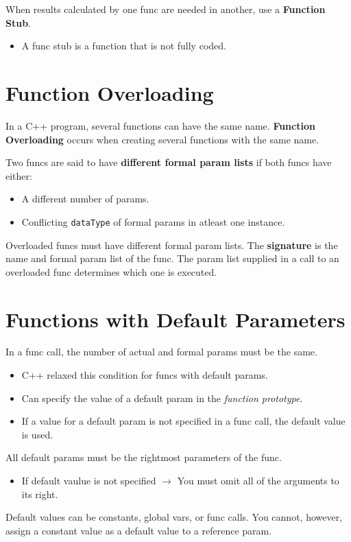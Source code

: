 \documentclass{article}
\begin{document}
\vspace{8pt}
When results calculated by one func are needed in another, use a
\textbf{Function Stub}.
\begin{itemize}
  \item A func stub is a function that is not fully coded.
\end{itemize}

\section{Function Overloading}
In a C++ program, several functions can have the same name. \textbf{Function
Overloading} occurs when creating several functions with the same name.

\vspace{8pt}
Two funcs are said to have \textbf{different formal param lists} if
both funcs have either:
\begin{itemize}
  \item A different number of params.
  \item Conflicting \texttt{dataType} of formal params in atleast one instance.
\end{itemize}

Overloaded funcs must have different formal param lists. The \textbf{signature}
is the name and formal param list of the func. The param list supplied in a call
to an overloaded func determines which one is executed.

\section{Functions with Default Parameters}
In a func call, the number of actual and formal params must be the same.
\begin{itemize}
  \item C++ relaxed this condition for funcs with default params. 
  \item Can specify the value of a default param in the \textit{function
    prototype}. 
  \item If a value for a default param is not specified in a func call, the
    default value is used.
\end{itemize}

All default params must be the rightmost parameters of the func.
\begin{itemize}
  \item If default vaulue is not specified $\rightarrow$ You must omit all of
    the arguments to its right. 
\end{itemize}

Default values can be constants, global vars, or func calls. You cannot,
however, assign a constant value as a default value to a reference param.
\end{document}
